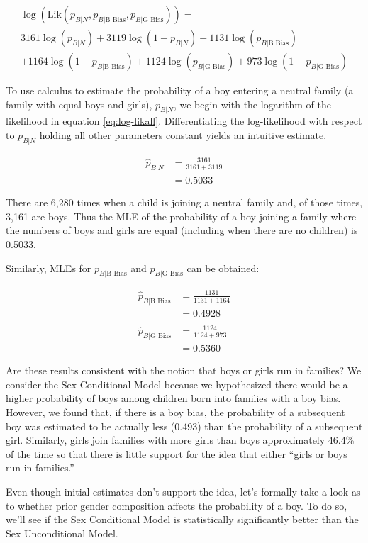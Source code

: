 \documentclass[
]{krantz}
\newcommand{\Lik}{\mathrm{Lik}}
\newcommand{\neutral}{p_{B|N}}
\newcommand{\gbias}{p_{B|\textrm{G Bias}}}
\newcommand{\bbias}{p_{B|\textrm{B Bias}}}
\begin{document}
\begin{multline}
\log(\Lik(\neutral,  \bbias, \gbias)) = \\  
 3161\log(\neutral)+3119\log(1-\neutral)+1131\log(\bbias) \\
 +1164\log(1-\bbias)+1124\log(\gbias)+ 973\log(1-\gbias)
\label{eq:log-likall} 
\end{multline}

To use calculus to estimate the probability of a boy entering a neutral family (a family with equal boys and girls), \(\neutral\), we begin with the logarithm of the likelihood in equation \eqref{eq:log-likall}. Differentiating the log-likelihood with respect to \(\neutral\) holding all other parameters constant yields an intuitive estimate.

\begin{align*}
 \hat{p}_{B|N}&=\frac{3161}{3161+3119} \\
 &=0.5033
\end{align*}

There are 6,280 times when a child is joining a neutral family and, of those times, 3,161 are boys. Thus the MLE of the probability of a boy joining a family where the numbers of boys and girls are equal (including when there are no children) is 0.5033.

Similarly, MLEs for \(\bbias\) and \(\gbias\) can be obtained:

\begin{align*}
 \hat{p}_{B|\textrm{B Bias}}&= \frac{1131}{1131+1164}\\
 & =  0.4928 \\
 &  \\
 \hat{p}_{B|\textrm{G Bias}}&=\frac{1124}{1124+973}\\
&= 0.5360
\end{align*}

Are these results consistent with the notion that boys or girls run in families? We consider the Sex Conditional Model because we hypothesized there would be a higher probability of boys among children born into families with a boy bias. However, we found that, if there is a boy bias, the probability of a subsequent boy was estimated to be actually less (0.493) than the probability of a subsequent girl. Similarly, girls join families with more girls than boys approximately 46.4\% of the time so that there is little support for the idea that either ``girls or boys run in families.''

Even though initial estimates don't support the idea, let's formally take a look as to whether prior gender composition affects the probability of a boy. To do so, we'll see if the Sex Conditional Model is statistically significantly better than the Sex Unconditional Model.
\end{document}
